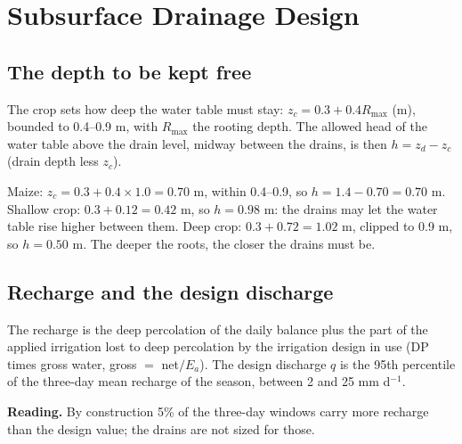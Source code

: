 \chapter{Subsurface Drainage Design}\label{chap:14}
\label{ch:drain}
\section{The depth to be kept free}
The crop sets how deep the water table must stay: $z_c=0.3+0.4R_{\max}$ (m), bounded to 0.4--0.9 m, with $R_{\max}$ the rooting depth. The allowed head of the water table above the drain level, midway between the drains, is then $h=z_d-z_c$ (drain depth less $z_c$).

\sol {}\ans Maize: $z_c=0.3+0.4\times1.0=0.70$ m, within 0.4--0.9, so $h=1.4-0.70=0.70$ m. Shallow crop: $0.3+0.12=0.42$ m, so $h=0.98$ m: the drains may let the water table rise higher between them. Deep crop: $0.3+0.72=1.02$ m, clipped to 0.9 m, so $h=0.50$ m. The deeper the roots, the closer the drains must be. \finans


\section{Recharge and the design discharge}
The recharge is the deep percolation of the daily balance plus the part of the applied irrigation lost to deep percolation by the irrigation design in use (DP times gross water, gross $=$ net$/E_a$). The design discharge $q$ is the 95th percentile of the three-day mean recharge of the season, between 2 and 25 mm d$^{-1}$.

\textbf{Reading.} By construction 5\% of the three-day windows carry more recharge than the design value; the drains are not sized for those.


